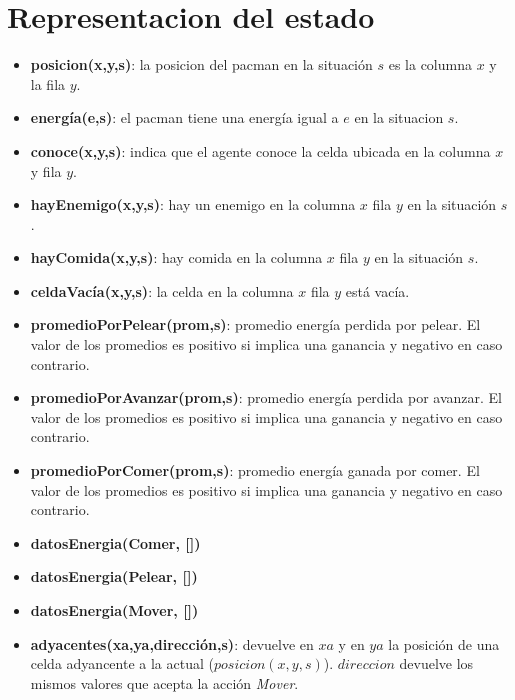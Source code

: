 \section{Representacion del estado}

\begin{itemize}

\item \textbf{posicion(x,y,s)}: la posicion del pacman en la situación $s$ es
la columna $x$ y la fila $y$.

\item \textbf{energía(e,s)}: el pacman tiene una energía igual a $e$ en la
situacion $s$.

\item \textbf{conoce(x,y,s)}: indica que el agente conoce la celda ubicada
en la columna $x$ y fila $y$.

\item \textbf{hayEnemigo(x,y,s)}: hay un enemigo en la columna $x$ fila $y$ en
la situación $s$.

\item \textbf{hayComida(x,y,s)}: hay comida en la columna $x$ fila $y$ en la
situación $s$.

\item \textbf{celdaVacía(x,y,s)}: la celda en la columna $x$ fila $y$ está
vacía.

\item \textbf{promedioPorPelear(prom,s)}: promedio energía perdida por pelear.
El valor de los promedios es positivo si implica una ganancia y negativo en
caso contrario.

\item \textbf{promedioPorAvanzar(prom,s)}: promedio energía perdida por
avanzar. El valor de los promedios es positivo si implica una ganancia y
negativo en caso contrario.

\item \textbf{promedioPorComer(prom,s)}: promedio energía ganada por comer. El
valor de los promedios es positivo si implica una ganancia y negativo en caso
contrario.

\item \textbf{datosEnergia(Comer, [])}

\item \textbf{datosEnergia(Pelear, [])}

\item \textbf{datosEnergia(Mover, [])}

\item \textbf{adyacentes(xa,ya,dirección,s)}: devuelve en $xa$ y en $ya$ la
posición de una celda adyancente a la actual ($posicion(x,y,s)$). $direccion$
devuelve los mismos valores que acepta la acción \emph{Mover}.

\end{itemize}
